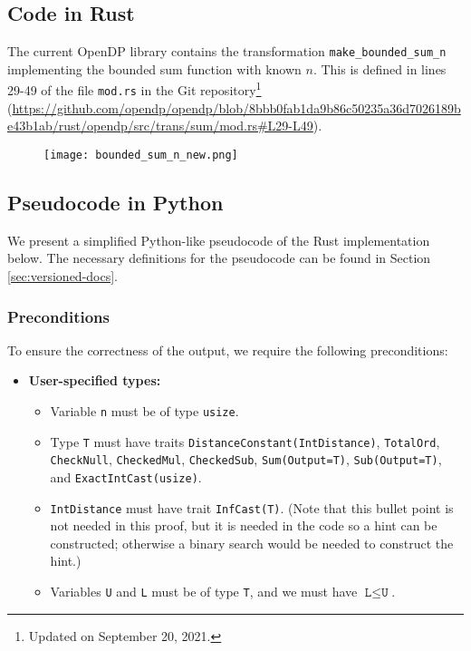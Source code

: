 \documentclass[11pt,a4paper]{article}
\theoremstyle{definition}
\begin{document}
\subsection{Code in Rust}
The current OpenDP library contains the transformation \texttt{make\_bounded\_sum\_n} implementing the bounded sum function with known $n$. This is defined in lines 29-49 of the file \texttt{mod.rs} in the Git repository\footnote{Updated on September 20, 2021.} (\url{https://github.com/opendp/opendp/blob/8bbb0fab1da9b86c50235a36d7026189be43b1ab/rust/opendp/src/trans/sum/mod.rs#L29-L49}).


\begin{figure}[ht]
    \texttt{[image: bounded\_sum\_n\_new.png]}
    \centering
    \label{fig:code}
\end{figure}

\subsection{Pseudocode in Python}
\label{sec:pseudocode}
We present a simplified Python-like pseudocode of the Rust implementation below. The necessary definitions for the pseudocode can be found in Section \ref{sec:versioned-docs}.

\subsubsection*{Preconditions}
To ensure the correctness of the output, we require the following preconditions:

\begin{itemize}
    \item \textbf{User-specified types:}
    \begin{itemize}
        \item Variable \texttt{n} must be of type \texttt{usize}.
        \item Type \texttt{T} must have traits \texttt{DistanceConstant(IntDistance)}, \texttt{TotalOrd}, \texttt{CheckNull}, \texttt{CheckedMul}, \texttt{CheckedSub}, \texttt{Sum(Output=T)}, \texttt{Sub(Output=T)},  and \texttt{ExactIntCast(usize)}.
        \item \texttt{IntDistance} must have trait \texttt{InfCast(T)}. (Note that this bullet point is not needed in this proof, but it is needed in the code so a hint can be constructed; otherwise a binary search would be needed to construct the hint.)
        \item Variables \texttt{U} and \texttt{L} must be of type \texttt{T}, and we must have $\texttt{L} \leq \texttt{U}$.

\end{itemize}
\end{itemize}
\end{document}
